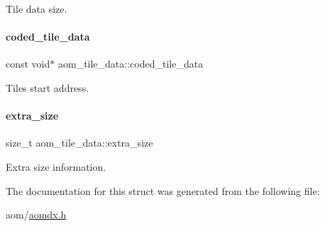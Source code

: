 Tile data size. \mbox{\label{structaom__tile__data_a05898249ddaf5ba799dd471113b0e51e}} 
\paragraph{\texorpdfstring{coded\+\_\+tile\+\_\+data}{coded\_tile\_data}}
{\footnotesize\ttfamily const void$\ast$ aom\+\_\+tile\+\_\+data\+::coded\+\_\+tile\+\_\+data}

Tile\textquotesingle{}s start address. \mbox{\label{structaom__tile__data_a936851e515bcea0af38d2d091f5adf65}} 
\paragraph{\texorpdfstring{extra\+\_\+size}{extra\_size}}
{\footnotesize\ttfamily size\+\_\+t aom\+\_\+tile\+\_\+data\+::extra\+\_\+size}

Extra size information. 

The documentation for this struct was generated from the following file\+:\begin{DoxyCompactItemize}
\item 
aom/\hyperlink{aomdx_8h}{aomdx.\+h}\end{DoxyCompactItemize}
